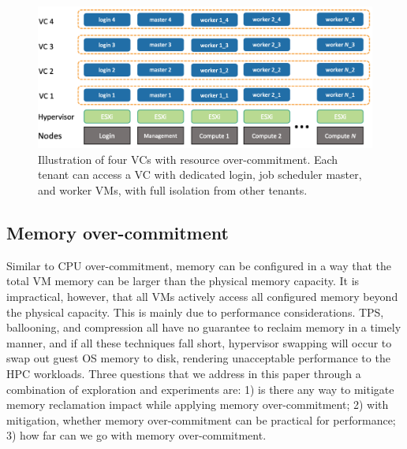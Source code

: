 
\begin{figure}[!t]
   \begin{center}
       \includegraphics[width=\columnwidth]{Figures/architecture}
   \end{center}
   \caption{Illustration of four VCs with resource over-commitment. Each tenant can access a VC with dedicated login, job scheduler master, and worker VMs, with full isolation from other tenants.}
   \label{fig:architecture}
 \end{figure}

\subsection{Memory over-commitment}
Similar to CPU over-commitment, memory can be configured in a way that the total VM memory can be 
larger than the physical memory capacity. It is impractical, however, that all VMs actively access all configured 
memory beyond the physical capacity. This is mainly due to performance considerations. TPS, ballooning, and 
compression all have no guarantee to reclaim memory in a timely manner, and if all these techniques fall short, 
hypervisor swapping will occur to swap out guest OS memory to disk, rendering unacceptable performance to 
the HPC workloads. Three questions that we address in this paper through a combination of exploration and experiments are: 1) is there any way to mitigate 
memory reclamation impact while applying memory over-commitment; 
2) with mitigation, whether memory over-commitment 
can be practical for performance; 3) how far can we go with memory over-commitment.

